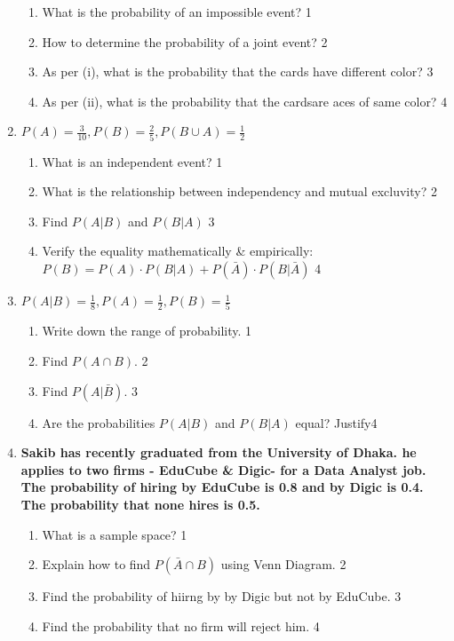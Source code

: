 \documentclass[a4paper,oneside, margin=1.4in]{book}
\begin{document}
\begin{enumerate}
  \begin{enumerate}
    \item
	What is the probability of an impossible event? \hfill 1
    \item
	How to determine the probability of a joint event?  \hfill 2
    \item  
	As per (i), what is the probability that the cards have different color? \hfill 3
    \item
	As per (ii), what is the probability that the cardsare aces of same color?  \hfill 4
  \end{enumerate}

 \item
	  \textbf{$P(A) = \frac{3}{10}, P(B) = \frac 25, P(B\cup A) = \frac12$} 
  
  \begin{enumerate}
    \item
	What is an independent event? \hfill 1
    \item
	What is the relationship between independency and mutual excluvity? \hfill 2
    \item  
	Find $P(A \vert B)$ and $P(B \vert A)$ \hfill 3
    \item
	Verify the equality mathematically \& empirically: $P(B) = P(A) \cdot P(B \vert A) + P(\bar A) \cdot P(B \vert \bar A)$ \hfill 4
  \end{enumerate}
  
   \item
  \textbf{$P(A\vert B) = \frac 1 8, P(A) = \frac 12, P(B) = \frac 15$}
 
  \begin{enumerate}
    \item
	Write down the range of probability. \hfill 1
    \item
    	Find $P(A\cap B)$.  \hfill 2
    \item
    	Find $P(A\vert \bar B)$. \hfill 3
     \item
     	Are the probabilities $P(A\vert B)$ and $P(B\vert A)$ equal? Justify\hfill 4
  \end{enumerate}

 \item
  \textbf{Sakib has recently graduated from the University of Dhaka. he applies to two firms - EduCube \& Digic- for a Data Analyst job. The probability of hiring by EduCube is 0.8 and by Digic is 0.4. The probability that none hires is 0.5.} 
  
  \begin{enumerate}
    \item
	What is a sample space? \hfill 1
    \item
	Explain how to find $P(\bar A \cap B)$ using Venn Diagram. \hfill 2
    \item  
	Find the probability of hiirng by by Digic but not by EduCube. \hfill 3
    \item
	Find the probability that no firm will reject him. \hfill 4
  \end{enumerate}


\end{enumerate}
\end{document}
